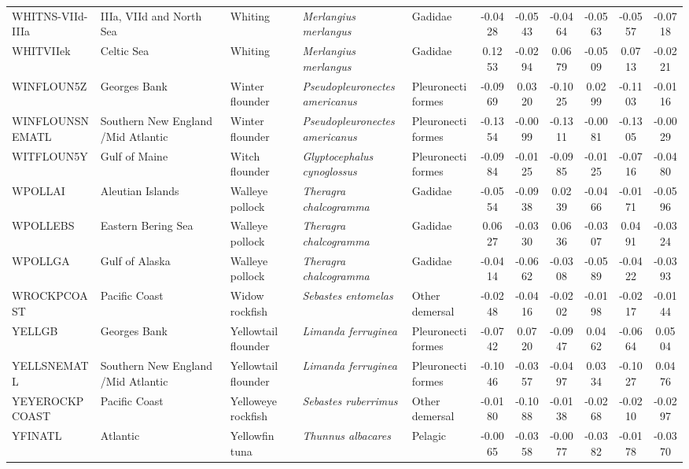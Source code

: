 \begin{longtable}{p{3cm}p{3cm}lllcccccc}
  WHITNS-VIId-IIIa & IIIa, VIId and North Sea & Whiting & \textit{Merlangius merlangus} & Gadidae & -0.0428 & -0.0543 & -0.0464 & -0.0563 & -0.0557 & -0.0718 \\
  WHITVIIek & Celtic Sea & Whiting & \textit{Merlangius merlangus} & Gadidae & 0.1253 & -0.0294 & 0.0679 & -0.0509 & 0.0713 & -0.0221 \\
  WINFLOUN5Z & Georges Bank & Winter flounder & \textit{Pseudopleuronectes americanus} & Pleuronectiformes & -0.0969 & 0.0320 & -0.1025 & 0.0299 & -0.1103 & -0.0116 \\
  WINFLOUNSNEMATL & Southern New England /Mid Atlantic & Winter flounder & \textit{Pseudopleuronectes americanus} & Pleuronectiformes & -0.1354 & -0.0099 & -0.1311 & -0.0081 & -0.1305 & -0.0029 \\
  WITFLOUN5Y & Gulf of Maine & Witch flounder & \textit{Glyptocephalus cynoglossus} & Pleuronectiformes & -0.0984 & -0.0125 & -0.0985 & -0.0125 & -0.0716 & -0.0480 \\
  WPOLLAI & Aleutian Islands & Walleye pollock & \textit{Theragra chalcogramma} & Gadidae & -0.0554 & -0.0938 & 0.0239 & -0.0466 & -0.0171 & -0.0596 \\
  WPOLLEBS & Eastern Bering Sea & Walleye pollock & \textit{Theragra chalcogramma} & Gadidae & 0.0627 & -0.0330 & 0.0636 & -0.0307 & 0.0491 & -0.0324 \\
  WPOLLGA & Gulf of Alaska & Walleye pollock & \textit{Theragra chalcogramma} & Gadidae & -0.0414 & -0.0662 & -0.0308 & -0.0589 & -0.0422 & -0.0393 \\
  WROCKPCOAST & Pacific Coast & Widow rockfish & \textit{Sebastes entomelas} & Other demersal & -0.0248 & -0.0416 & -0.0202 & -0.0198 & -0.0217 & -0.0144 \\
  YELLGB & Georges Bank & Yellowtail flounder & \textit{Limanda ferruginea} & Pleuronectiformes & -0.0742 & 0.0720 & -0.0947 & 0.0462 & -0.0664 & 0.0504 \\
  YELLSNEMATL & Southern New England /Mid Atlantic & Yellowtail flounder & \textit{Limanda ferruginea} & Pleuronectiformes & -0.1046 & -0.0357 & -0.0497 & 0.0334 & -0.1027 & 0.0476 \\
  YEYEROCKPCOAST & Pacific Coast & Yelloweye rockfish & \textit{Sebastes ruberrimus} & Other demersal & -0.0180 & -0.1088 & -0.0138 & -0.0268 & -0.0210 & -0.0297 \\
  YFINATL & Atlantic & Yellowfin tuna & \textit{Thunnus albacares} & Pelagic & -0.0065 & -0.0358 & -0.0077 & -0.0382 & -0.0178 & -0.0370 \\

\end{longtable}
